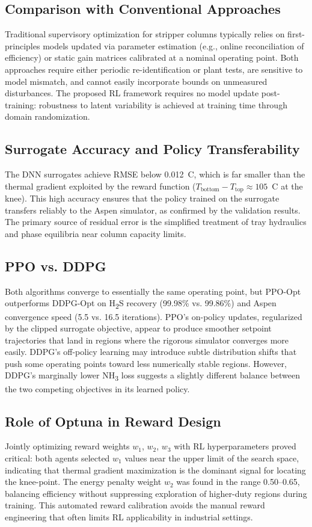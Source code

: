 \documentclass[journal,10pt,twocolumn]{IEEEtran}
\begin{document}
\subsection{Comparison with Conventional Approaches}
Traditional supervisory optimization for stripper columns typically relies on first-principles models updated via parameter estimation (e.g., online reconciliation of efficiency) or static gain matrices calibrated at a nominal operating point. Both approaches require either periodic re-identification or plant tests, are sensitive to model mismatch, and cannot easily incorporate bounds on unmeasured disturbances. The proposed RL framework requires no model update post-training: robustness to latent variability is achieved at training time through domain randomization.

\subsection{Surrogate Accuracy and Policy Transferability}
The DNN surrogates achieve RMSE below 0.012~\textdegree C, which is far smaller than the thermal gradient exploited by the reward function ($T_\text{bottom} - T_\text{top} \approx 105$~\textdegree C at the knee). This high accuracy ensures that the policy trained on the surrogate transfers reliably to the Aspen simulator, as confirmed by the validation results. The primary source of residual error is the simplified treatment of tray hydraulics and phase equilibria near column capacity limits.

\subsection{PPO vs. DDPG}
Both algorithms converge to essentially the same operating point, but PPO-Opt outperforms DDPG-Opt on H\textsubscript{2}S recovery (99.98\% vs. 99.86\%) and Aspen convergence speed (5.5 vs. 16.5 iterations). PPO's on-policy updates, regularized by the clipped surrogate objective, appear to produce smoother setpoint trajectories that land in regions where the rigorous simulator converges more easily. DDPG's off-policy learning may introduce subtle distribution shifts that push some operating points toward less numerically stable regions. However, DDPG's marginally lower NH\textsubscript{3} loss suggests a slightly different balance between the two competing objectives in its learned policy.

\subsection{Role of Optuna in Reward Design}
Jointly optimizing reward weights $w_1$, $w_2$, $w_3$ with RL hyperparameters proved critical: both agents selected $w_1$ values near the upper limit of the search space, indicating that thermal gradient maximization is the dominant signal for locating the knee-point. The energy penalty weight $w_2$ was found in the range 0.50--0.65, balancing efficiency without suppressing exploration of higher-duty regions during training. This automated reward calibration avoids the manual reward engineering that often limits RL applicability in industrial settings.
\end{document}
